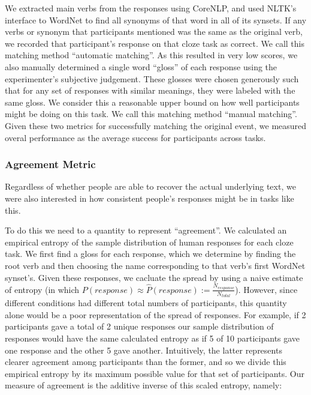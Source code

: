 \documentclass[10pt,a4paper]{article}
\begin{document}
We extracted main verbs from the responses using CoreNLP, and used NLTK's interface to WordNet \cite{bird2009natural, miller1998wordnet} to find all synonyms of that word in all of its synsets. If any verbs or synonym that participants mentioned was the same as the original verb, we recorded that participant's response on that cloze task as correct.
We call this matching method ``automatic matching''.
As this resulted in very low scores, we also manually determined a single word ``gloss'' of each response using the experimenter's subjective judgement. These glosses were chosen generously such that for any set of responses with similar meanings, they were labeled with the same gloss. We consider this a reasonable upper bound on how well participants might be doing on this task.
We call this matching method ``manual matching''.
Given these two metrics for successfully matching the original event, we measured overal performance as the average success for participants across tasks.

\subsubsection{Agreement Metric}

Regardless of whether people are able to recover the actual underlying text, we were also interested in how consistent people's responses might be in tasks like this.

To do this we need to a quantity to represent ``agreement''. We calculated an empirical entropy of the sample distribution of human responses
for each cloze task. We first find a gloss for each response, which we determine by finding the root verb and then choosing the name corresponding to that verb's first WordNet synset's.
Given these responses, we cacluate the spread by using
a naive estimate of entropy 
(in which $P(response) \approx \hat{P}(response) := \frac{N_{response}}{N_{total}}$).
However, since different conditions had different total numbers of participants, this quantity alone would be a poor representation of the spread of responses. For example, if 2 participants gave a total of 2 unique responses our sample distribution of responses would have the same calculated entropy as if 5 of 10 participants gave one response and the other 5 gave another. Intuitively, the latter represents clearer agreement among participants than the former, and so we divide this empirical entropy by its maximum possible value for that set of participants. Our measure of agreement is the additive inverse of this scaled entropy, namely:
\end{document}
